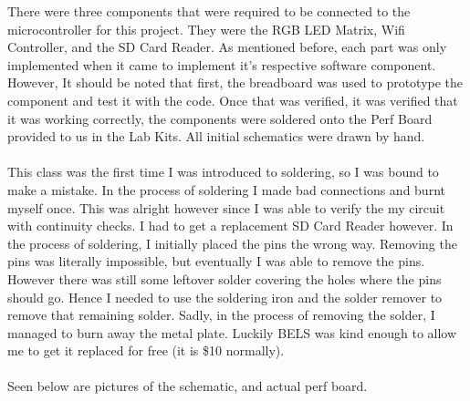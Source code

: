 \documentclass[a4paper, 12pt]{article}
\begin{document}
    There were three components that were required to be connected to the
    microcontroller for this project. They were the RGB LED Matrix, Wifi
    Controller, and the SD Card Reader. As mentioned before, each part was
    only implemented when it came to implement it's respective software
    component. However, It should be noted that first, the breadboard
    was used to prototype the component and test it with the code. Once that
    was verified, it was verified that it was working correctly, the
    components were soldered onto the Perf Board provided to us in the Lab
    Kits. All initial schematics were drawn by hand. 
    \\ \\
    This class was the first time I was introduced to soldering, so I was
    bound to make a mistake. In the process of soldering I made bad
    connections and burnt myself once. This was alright however since I was
    able to verify the my circuit with continuity checks. I had to get a
    replacement SD Card Reader however. In the process of soldering, I
    initially placed the pins the wrong way. Removing the pins was literally
    impossible, but eventually I was able to remove the pins. However there
    was still some leftover solder covering the holes where the pins should
    go. Hence I needed to use the soldering iron and the solder remover to
    remove that remaining solder. Sadly, in the process of removing the
    solder, I managed to burn away the metal plate. Luckily BELS was kind
    enough to allow me to get it replaced for free (it is \$10 normally).
    \\ \\
    Seen below are pictures of the schematic, and actual perf board.
\end{document}

